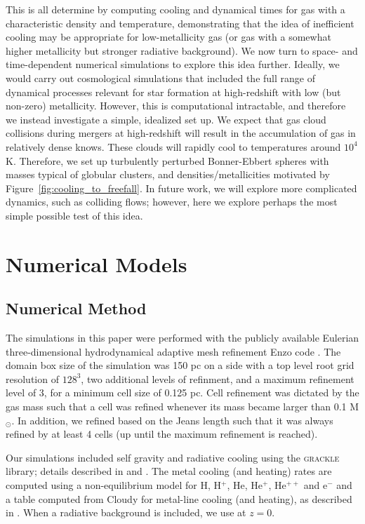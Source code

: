 \documentclass[useAMS,usenatbib]{mn2e}
\begin{document}
This is all determine by computing cooling and dynamical times for gas with a characteristic density and temperature, demonstrating that the idea of inefficient cooling may be appropriate for low-metallicity gas (or gas with a somewhat higher metallicity but stronger radiative background).   We now turn to space- and time-dependent numerical simulations to explore this idea further.  Ideally, we would carry out cosmological simulations that included the full range of dynamical processes relevant for star formation at high-redshift with low (but non-zero) metallicity.  However, this is computational intractable, and therefore we instead investigate a simple, idealized set up.  We expect that gas cloud collisions during mergers at high-redshift will result in the accumulation of gas in relatively dense knows.  These clouds will rapidly cool to temperatures around $10^4$ K.  Therefore, we set up turbulently perturbed Bonner-Ebbert spheres with masses typical of globular clusters, and densities/metallicities motivated by Figure~\ref{fig:cooling_to_freefall}.   In future work, we will explore more complicated dynamics, such as colliding flows; however, here we explore perhaps the most simple possible test of this idea.


%
\section{Numerical Models}
\label{sec:numerical}
\subsection{Numerical Method}

The simulations in this paper were performed with the publicly available Eulerian three-dimensional
hydrodynamical adaptive mesh refinement Enzo code \citep{Bryan2014}. The domain
box size of the simulation was 150 pc on a side with a top level root grid resolution of $128^3$, two
additional levels of refinment, and a maximum refinement level of 3, for a minimum cell size of 0.125 pc.  Cell refinement was dictated 
by the gas mass such that a cell was refined whenever its mass became larger than 0.1 M$_\odot$.
In addition, we refined based on the Jeans length such that it was always refined by at least 4 cells (up until
the maximum refinement is reached).

Our simulations included self gravity and radiative cooling using the
\textsc{grackle} library; details described in \cite{Bryan2014} and \cite{Smith2016}. The metal cooling (and
heating) rates are computed using a non-equilibrium model for H, H$^+$, He, He$^+$, He$^{++}$ and e$^-$
and a table computed from Cloudy for metal-line cooling (and heating), as described in \citet{Smith2016}.
When a radiative background is included, we use \cite{Haardt2012} at $z=0$.
\end{document}
